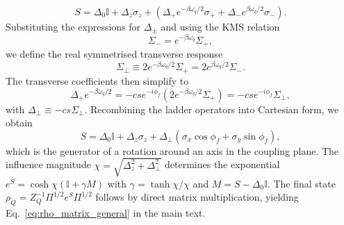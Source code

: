 \begin{equation}
    S = \Delta_0 \mathbb{I} + \Delta_z \sigma_z + (\Delta_+ e^{-\beta\omega_q/2} \sigma_+ + \Delta_- e^{\beta\omega_q/2} \sigma_-).
\end{equation}
Substituting the expressions for $\Delta_\pm$ and using the KMS relation
\begin{equation}
    \Sigma_- = e^{-\beta\omega_q} \Sigma_+,
    \label{eq:kms_sigma_relation}
\end{equation}
we define the real symmetrised transverse response
\begin{equation}
    \Sigma_\perp \equiv 2 e^{-\beta\omega_q/2} \Sigma_+ = 2 e^{\beta\omega_q/2} \Sigma_-.
\end{equation}
The transverse coefficients then simplify to
\begin{equation}
    \Delta_+ e^{-\beta\omega_q/2} = -c s e^{-i \phi_f} (2 e^{-\beta\omega_q/2} \Sigma_+) = -c s e^{-i\phi_f} \Sigma_\perp,
\end{equation}
with $\Delta_\perp \equiv -c s \Sigma_\perp$. 
Recombining the ladder operators into Cartesian form, we obtain
\begin{equation}
    S = \Delta_0 \mathbb{I} + \Delta_z \sigma_z + \Delta_\perp (\sigma_x \cos\phi_f + \sigma_y \sin\phi_f),
\end{equation}
which is the generator of a rotation around an axis in the coupling plane. The influence magnitude $\chi = \sqrt{\Delta_z^2 + \Delta_\perp^2}$ determines the exponential $e^S = \cosh\chi (\mathbb{I} + \gamma M)$ with $\gamma = \tanh\chi/\chi$ and $M = S - \Delta_0 \mathbb{I}$. The final state $\rho_Q = Z_Q^{-1} \Pi^{1/2} e^S \Pi^{1/2}$ follows by direct matrix multiplication, yielding Eq.~\eqref{eq:rho_matrix_general} in the main text.
